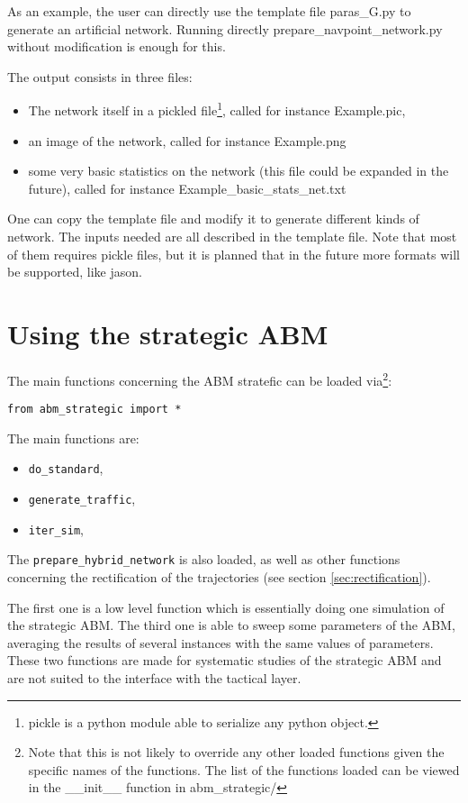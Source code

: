 \documentclass[12pt]{article}
\begin{document}
As an example, the user can directly use the template file paras\_G.py to generate an artificial network. Running directly prepare\_navpoint\_network.py without modification is enough for this.

The output consists in three files: 
\begin{itemize}
\item The network itself in a pickled file\footnote{pickle is a python module able to serialize any python object.}, called for instance Example.pic,
\item an image of the network, called for instance Example.png
\item some very basic statistics on the network (this file could be expanded in the future), called for instance Example\_basic\_stats\_net.txt
\end{itemize}

One can copy the template file and modify it to generate different kinds of network. The inputs needed are all described in the template file. Note that most of them requires pickle files, but it is planned that in the future more formats will be supported, like jason.
         


\section{Using the strategic ABM}

The main functions concerning the ABM stratefic can be loaded via\footnote{Note that this is not likely to override any other loaded functions given the specific names of the functions. The list of the functions loaded can be viewed in the \_\_init\_\_ function in abm\_strategic/}:
\begin{verbatim}
from abm_strategic import *
\end{verbatim}

The main functions are:
\begin{itemize}
\item \verb|do_standard|,
\item \verb|generate_traffic|,
\item \verb|iter_sim|,
\end{itemize}

The \verb|prepare_hybrid_network| is also loaded, as well as other functions concerning the rectification of the trajectories (see section \ref{sec:rectification}).

The first one is a low level function which is essentially doing one simulation of the strategic ABM. The third one is able to sweep some parameters of the ABM, averaging the results of several instances with the same values of parameters. These two functions are made for systematic studies of the strategic ABM and are not suited to the interface with the tactical layer.
\end{document}
